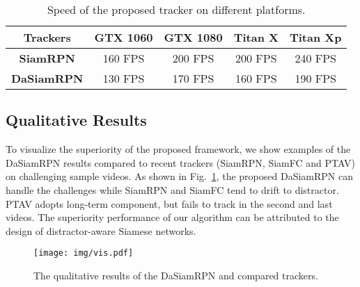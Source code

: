\documentclass[runningheads]{llncs}
\begin{document}
\begin{table}[tp]
\scriptsize
  \centering
  \caption{Speed of the proposed tracker on different platforms.}
\begin{tabular}{ccccc}
\hline
\bf Trackers & \bf GTX 1060 & \bf GTX 1080 & \bf Titan X  & \bf Titan Xp\\
\hline
\textbf{SiamRPN}   &  160 FPS &  200 FPS     &  200 FPS     &  240 FPS\\\hline
\textbf{DaSiamRPN} &  130 FPS &  170 FPS     &  160 FPS     &  190 FPS\\\hline
\end{tabular}
   \label{speed_table}
\end{table}

\subsection{Qualitative Results}
To visualize the superiority of the proposed framework, we show examples of the DaSiamRPN results compared to recent trackers (SiamRPN, SiamFC and PTAV) on challenging sample videos. As shown in Fig.~\ref{vis}, the proposed DaSiamRPN can handle the challenges while SiamRPN and SiamFC tend to drift to distractor. PTAV adopts long-term component, but fails to track in the second and last videos. The superiority performance of our algorithm can be attributed to the design of distractor-aware Siamese networks.\begin{figure}[htbp]
\centering
\texttt{[image: img/vis.pdf]}
\caption{The qualitative results of the DaSiamRPN and compared trackers.}
\label{vis}
\end{figure}
\end{document}
